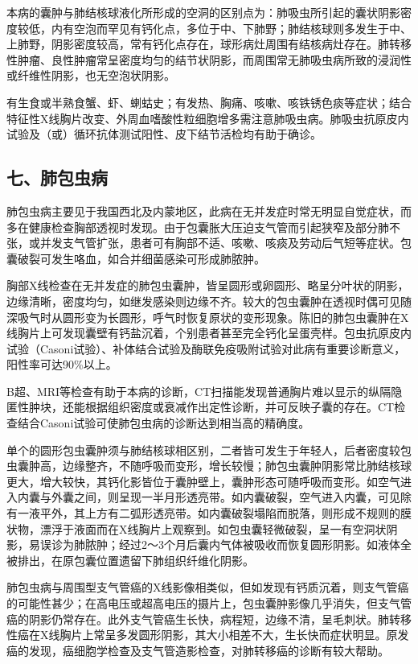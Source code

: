 本病的囊肿与肺结核球液化所形成的空洞的区别点为：肺吸虫所引起的囊状阴影密度较低，内有空泡而罕见有钙化点，多位于中、下肺野；肺结核球则多发生于中、上肺野，阴影密度较高，常有钙化点存在，球形病灶周围有结核病灶存在。肺转移性肿瘤、良性肿瘤常呈密度均匀的结节状阴影，而周围常无肺吸虫病所致的浸润性或纤维性阴影，也无空泡状阴影。

有生食或半熟食蟹、虾、蝲蛄史；有发热、胸痛、咳嗽、咳铁锈色痰等症状；结合特征性X线胸片改变、外周血嗜酸性粒细胞增多需注意肺吸虫病。肺吸虫抗原皮内试验及（或）循环抗体测试阳性、皮下结节活检均有助于确诊。

\subsection{七、肺包虫病}

肺包虫病主要见于我国西北及内蒙地区，此病在无并发症时常无明显自觉症状，而多在健康检查胸部透视时发现。由于包囊胀大压迫支气管而引起狭窄及部分肺不张，或并发支气管扩张，患者可有胸部不适、咳嗽、咳痰及劳动后气短等症状。包囊破裂可发生咯血，如合并细菌感染可形成肺脓肿。

胸部X线检查在无并发症的肺包虫囊肿，皆呈圆形或卵圆形、略呈分叶状的阴影，边缘清晰，密度均匀，如继发感染则边缘不齐。较大的包虫囊肿在透视时偶可见随深吸气时从圆形变为长圆形，呼气时恢复原状的变形现象。陈旧的肺包虫囊肿在X线胸片上可发现囊壁有钙盐沉着，个别患者甚至完全钙化呈蛋壳样。包虫抗原皮内试验（Casoni试验）、补体结合试验及酶联免疫吸附试验对此病有重要诊断意义，阳性率可达90\%以上。

B超、MRI等检查有助于本病的诊断，CT扫描能发现普通胸片难以显示的纵隔隐匿性肿块，还能根据组织密度或衰减作出定性诊断，并可反映子囊的存在。CT检查结合Casoni试验可使肺包虫病的诊断达到相当高的精确度。

单个的圆形包虫囊肿须与肺结核球相区别，二者皆可发生于年轻人，后者密度较包虫囊肿高，边缘整齐，不随呼吸而变形，增长较慢；肺包虫囊肿阴影常比肺结核球更大，增大较快，其钙化影皆位于囊肿壁上，囊肿形态可随呼吸而变形。如空气进入内囊与外囊之间，则呈现一半月形透亮带。如内囊破裂，空气进入内囊，可见除有一液平外，其上方有二弧形透亮带。如内囊破裂塌陷而脱落，则形成不规则的膜状物，漂浮于液面而在X线胸片上观察到。如包虫囊轻微破裂，呈一有空洞状阴影，易误诊为肺脓肿；经过2～3个月后囊内气体被吸收而恢复圆形阴影。如液体全被排出，在原包囊位置遗留下肺组织纤维化阴影。

肺包虫病与周围型支气管癌的X线影像相类似，但如发现有钙质沉着，则支气管癌的可能性甚少；在高电压或超高电压的摄片上，包虫囊肿影像几乎消失，但支气管癌的阴影仍常存在。此外支气管癌生长快，病程短，边缘不清，呈毛刺状。肺转移性癌在X线胸片上常呈多发圆形阴影，其大小相差不大，生长快而症状明显。原发癌的发现，癌细胞学检查及支气管造影检查，对肺转移癌的诊断有较大帮助。

